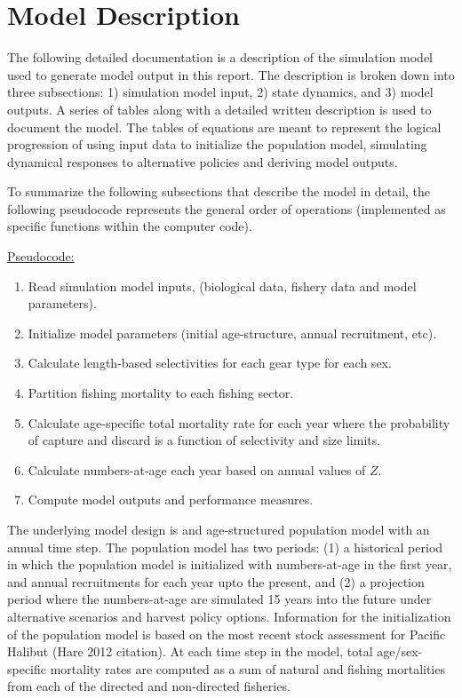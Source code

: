 
\section{Model Description} %
\label{sec:model_description}

The following detailed documentation is a description of the simulation model used to generate model output in this report.  The description is broken down into three subsections: 1) simulation model input, 2) state dynamics, and 3) model outputs.  A series of tables along with a detailed written description is used to document the model.  The tables of equations are meant to represent the logical progression of using input data to initialize the population model, simulating dynamical responses to alternative policies and deriving model outputs.

To summarize the following subsections that describe the model in detail, the following pseudocode represents the general order of operations (implemented as specific functions within the computer code).

\noindent\underline{Pseudocode:}
\begin{enumerate}
	\item Read simulation model inputs, (biological data, fishery data and model parameters).
	\item Initialize model parameters (initial age-structure, annual recruitment, etc).
	\item Calculate length-based selectivities for each gear type for each sex.
	\item Partition fishing mortality to each fishing sector.
	\item Calculate age-specific total mortality rate for each year where the probability of capture and discard is a function of selectivity and size limits.
	\item Calculate numbers-at-age each year based on annual values of $Z$.
	\item Compute model outputs and performance measures.
\end{enumerate}

The underlying model design is and age-structured population model with an annual time step.  The population model has two periods: (1) a historical period in which the population model is initialized with numbers-at-age in the first year, and annual recruitments for each year upto the present, and (2) a projection period where the numbers-at-age are simulated 15 years into the future under alternative scenarios and harvest policy options.  Information for the initialization of the population model is based on the most recent stock assessment for Pacific Halibut (Hare 2012 citation).  At each time step in the model, total age/sex-specific mortality rates are computed as a sum of natural and fishing mortalities from each of the directed and non-directed fisheries.

